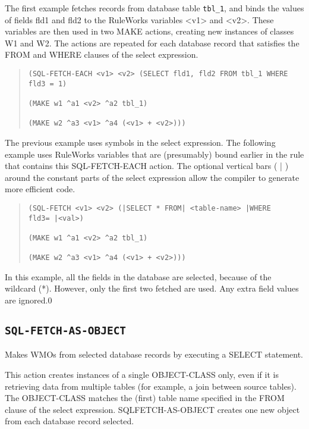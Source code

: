 {{\Example

The first example fetches records from database table \verb|tbl_1|,
and binds the values of fields fld1 and fld2 to the RuleWorks
variables <v1> and <v2>. These variables are then used in two
MAKE actions, creating new instances of classes W1 and W2.
The actions are repeated for each database record that
satisfies the FROM and WHERE clauses of the select
expression.

\begin{quote}
\begin{verbatim}
(SQL-FETCH-EACH <v1> <v2> (SELECT fld1, fld2 FROM tbl_1 WHERE
fld3 = 1)

(MAKE w1 ^a1 <v2> ^a2 tbl_1)

(MAKE w2 ^a3 <v1> ^a4 (<v1> + <v2>)))
\end{verbatim}
\end{quote}

The previous example uses symbols in the select expression.
The following example uses RuleWorks variables that are
(presumably) bound earlier in the rule that contains this
SQL-FETCH-EACH action. The optional vertical bars ( | )
around the constant parts of the select expression allow the
compiler to generate more efficient code.
\begin{quote}
\begin{verbatim}
(SQL-FETCH <v1> <v2> (|SELECT * FROM| <table-name> |WHERE
fld3= |<val>)

(MAKE w1 ^a1 <v2> ^a2 tbl_1)

(MAKE w2 ^a3 <v1> ^a4 (<v1> + <v2>)))
\end{verbatim}
\end{quote}

In this example, all the fields in the database are selected,
because of the wildcard (*). However, only the first two
fetched are used. Any extra field values are ignored.0





\subsection{\tt{SQL-FETCH-AS-OBJECT}}

Makes WMOs from selected database records by executing a
SELECT statement.

This action creates instances of a single OBJECT-CLASS only,
even if it is retrieving data from multiple tables (for
example, a join between source tables). The OBJECT-CLASS
matches the (first) table name specified in the FROM clause
of the select expression. SQLFETCH-AS-OBJECT creates one new
object from each database record selected.

}}
